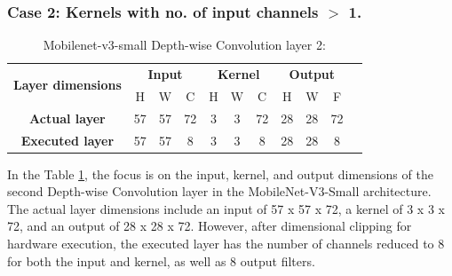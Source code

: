 \subsubsection{Case 2: Kernels with no. of input channels $>$ 1.}

\begin{table}[H]
\centering
\caption{Mobilenet-v3-small Depth-wise Convolution layer 2:}
\label{tab:permDConvolutionCase2Dim}
 \begin{tabular}{|c|c|c|c|c|c|c|c|c|c|c|} \hline  
 
 \multirow{2}{*}{\textbf{Layer dimensions}} &  
 \multicolumn{3}{|c|}{\textbf{Input}} &  
 \multicolumn{3}{|c|}{\textbf{Kernel}} &  
 \multicolumn{3}{|c|}{\textbf{Output}}\\ \cline{2-10}
 & H &  W &  C&  H &  W &  C &  H &  W & F\\ \hline  
 \textbf{Actual layer} &  57 &  57 & 72 & 3 & 3 & 72 & 28 & 28 & 72\\ \hline 
 \textbf{Executed layer} &  57 &  57 &  \cellcolor{yellow}8 & 3 & 3 & \cellcolor{yellow}8 & 28 & 28 & \cellcolor{yellow}8 \\ \hline 
 \end{tabular}
\end{table}

In the Table \ref{tab:permDConvolutionCase2Dim}, the focus is on the input, kernel, and output dimensions of the second Depth-wise Convolution layer in the MobileNet-V3-Small architecture. The actual layer dimensions include an input of 57 x 57 x 72, a kernel of 3 x 3 x 72, and an output of 28 x 28 x 72. However, after dimensional clipping for hardware execution, the executed layer has the number of channels reduced to 8 for both the input and kernel, as well as 8 output filters. 
\\
\begin{table}[H]
\centering
\caption{Sweep (kernel permutation)}
\label{tab:permDConvolutionCase2Sweep}
\end{table}

